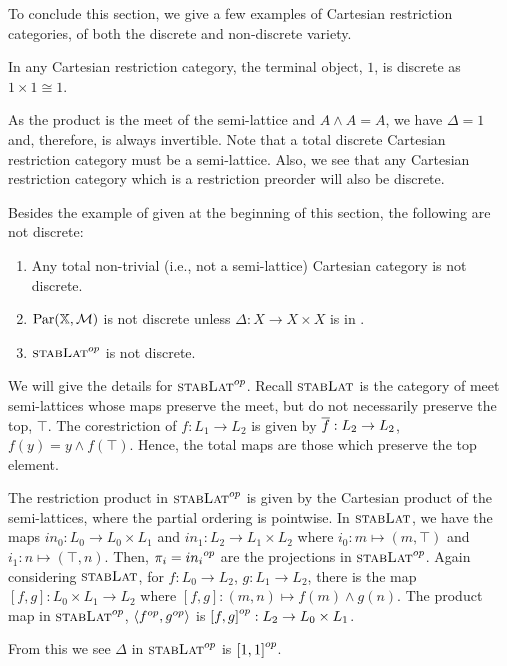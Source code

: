 To conclude this section, we give a few examples of Cartesian restriction categories, of both the
discrete and non-discrete variety.

\begin{example}\label{ex:terminal_object_is_discrete}
  In any Cartesian restriction category, the terminal object, $1$, is discrete as $1\times 1 \cong 1$.
\end{example}

\begin{example}\label{ex:semi-lattice_is_discrete}
  As the product is the meet of the semi-lattice and $A\wedge A = A$, we have $\Delta = 1$ and,
  therefore, is always invertible. Note that a total discrete Cartesian restriction category must be a
  semi-lattice. Also, we see that any Cartesian restriction category which is a restriction preorder
  will also be discrete.
\end{example}

\begin{example}\label{ex:various_not_discrete}
Besides the example of \topcatp given at the beginning of this section, the following are not discrete:
  \begin{enumerate}[{(}i{)}]
  \item Any total non-trivial (i.e., not a semi-lattice) Cartesian category is not discrete.
  \item $\text{Par}(\mathbb{X},\mathcal{M})$ is not discrete unless $\Delta: X\to X\times X$ is in \Mstab.
  \item ${\textsc{stabLat}}^{op}$ is not discrete.
  \end{enumerate}
  We will give the details for ${\textsc{stabLat}}^{op}$. Recall $\textsc{stabLat}$ is the category of meet
  semi-lattices whose maps preserve the meet, but do not necessarily preserve the top, $\top$. The
  corestriction of $f:L_1\to L_2$ is given by $\overline{f}:L_2\to L_2$, $f(y) = y\wedge f(\top)$. Hence,
  the total maps are those which preserve the top element.

  The restriction product in ${\textsc{stabLat}}^{op}$ is given by the Cartesian product of the
  semi-lattices, where the partial ordering is pointwise. In $\textsc{stabLat}$, we have the maps $in_0: L_0
  \to L_0\times L_1$ and $in_1:L_2 \to L_1\times L_2$ where $i_0: m\mapsto (m,\top)$ and $i_1: n \mapsto
  (\top,n)$. Then, $\pi_i = {in_i}^{op}$ are the projections in ${\textsc{stabLat}}^{op}$. Again considering
  $\textsc{stabLat}$, for $f:L_0 \to L_2$, $g:L_1 \to L_2$, there is the map $[f,g]:L_0\times L_1 \to L_2$
  where $[f,g]:(m,n)\mapsto f(m)\wedge g(n)$. The product map in ${\textsc{stabLat}}^{op}$,
  $\langle{f}^{op},{g}^{op}\rangle$ is ${[f,g]}^{op}:L_2 \to L_0\times L_1$.

  From this we see $\Delta$ in ${\textsc{stabLat}}^{op}$ is ${[1,1]}^{op}$.

\end{example}




